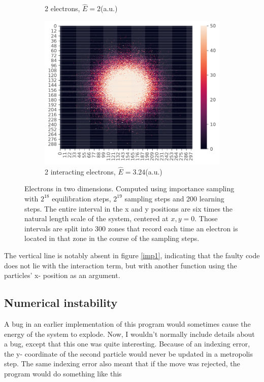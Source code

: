 \documentclass[11pt,a4paper,titlepage]{article}
\begin{document}
\begin{figure}[H]
\begin{subfigure}[t]{.5\textwidth}
\caption{2 electrons, $\hat E = 2$(a.u.)}
\label{imp2}
\end{subfigure}
\begin{subfigure}[b]{.5\textwidth}
\centering
\includegraphics[trim=0cm 0.0cm 0cm 0.0cm,scale = 0.6]{D2_P_2I_Y_Importance_S_2pow19_eqS_2pow18_Position_sampling_P_2_NH_2_I_1.pdf}
\caption{2 interacting electrons, $\hat E = 3.24$(a.u.)}
\label{imp3}
\end{subfigure}
\caption[as]{Electrons in two dimensions. Computed using importance sampling with $2^{18}$ equilibration steps, $2^{19}$ sampling steps and 200 learning steps. The entire interval in the x and y positions are six times the natural length scale of the system, centered at $x,y =0$. Those intervals are split into 300 zones that record each time an electron is located in that zone in the course of the sampling steps. }
\label{fig:IMportance_pos_sampling}
\end{figure}
The vertical line is notably absent in figure \ref{imp1}, indicating that the faulty code does not lie with the interaction term, but with another function using the particles' x- position as an argument.
\subsection{Numerical instability}
A bug in an earlier implementation of this program would sometimes cause the energy of the system to explode. Now, I wouldn't normally include details about a bug, except that this one was quite interesting. Because of an indexing error, the y- coordinate of the second particle would never be updated in a metropolis step. The same indexing error also meant that if the move was rejected, the program would do something like this
\end{document}
